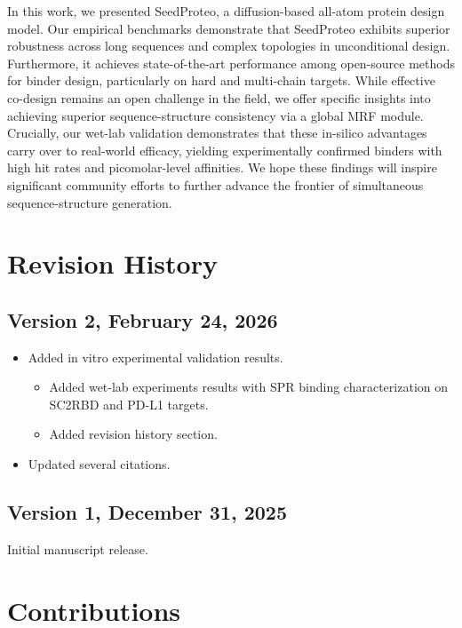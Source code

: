 \documentclass[]{bytedance_seed}
\begin{document}
In this work, we presented SeedProteo, a diffusion-based all-atom protein design model. Our empirical benchmarks demonstrate that SeedProteo exhibits superior robustness across long sequences and complex topologies in unconditional design. Furthermore, it achieves state-of-the-art performance among open-source methods for binder design, particularly on hard and multi-chain targets. While effective co-design remains an open challenge in the field, we offer specific insights into achieving superior sequence-structure consistency via a global MRF module. Crucially, our wet-lab validation demonstrates that these in-silico advantages carry over to real-world efficacy, yielding experimentally confirmed binders with high hit rates and picomolar-level affinities. We hope these findings will inspire significant community efforts to further advance the frontier of simultaneous sequence-structure generation.


\newpage


\section{Revision History}
\subsection*{Version 2, February 24, 2026}

\begin{itemize} 
    \item Added in vitro experimental validation results.
    \begin{itemize}
        \item Added wet-lab experiments results with SPR binding characterization on SC2RBD and PD-L1 targets.
        \item Added revision history section.
    \end{itemize}
    \item Updated several citations.
\end{itemize}

\subsection*{Version 1, December 31, 2025}
Initial manuscript release.


\newpage

\section*{Contributions}
\end{document}
